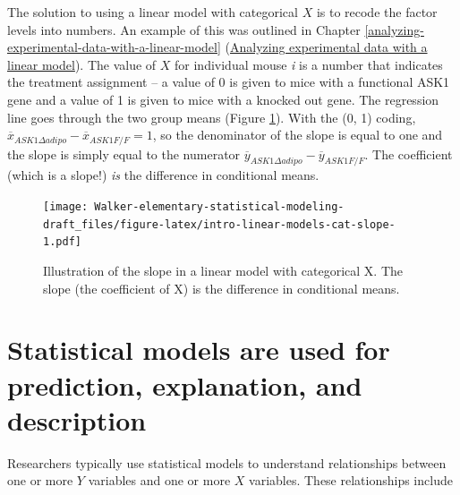 \documentclass[]{book}
\begin{document}
The solution to using a linear model with categorical \(X\) is to recode the factor levels into numbers. An example of this was outlined in Chapter \ref{analyzing-experimental-data-with-a-linear-model} (\protect\hyperlink{analyzing-experimental-data-with-a-linear-model}{Analyzing experimental data with a linear model}). The value of \(X\) for individual mouse \emph{i} is a number that indicates the treatment assignment -- a value of 0 is given to mice with a functional ASK1 gene and a value of 1 is given to mice with a knocked out gene. The regression line goes through the two group means (Figure \ref{fig:intro-linear-models-cat-slope}). With the (0, 1) coding, \(\overline{x}_{ASK1Δadipo} - \overline{x}_{ASK1F/F} = 1\), so the denominator of the slope is equal to one and the slope is simply equal to the numerator \(\overline{y}_{ASK1Δadipo} - \overline{y}_{ASK1F/F}\). The coefficient (which is a slope!) \emph{is} the difference in conditional means.

\begin{figure}
\centering
\texttt{[image: Walker-elementary-statistical-modeling-draft\_files/figure-latex/intro-linear-models-cat-slope-1.pdf]}
\caption{\label{fig:intro-linear-models-cat-slope}Illustration of the slope in a linear model with categorical X. The slope (the coefficient of X) is the difference in conditional means.}
\end{figure}

\hypertarget{statistical-models-are-used-for-prediction-explanation-and-description}{%
\section{Statistical models are used for prediction, explanation, and description}\label{statistical-models-are-used-for-prediction-explanation-and-description}}

Researchers typically use statistical models to understand relationships between one or more \(Y\) variables and one or more \(X\) variables. These relationships include
\end{document}
